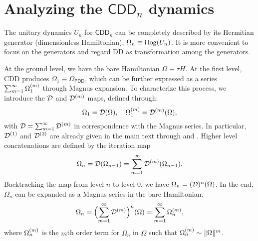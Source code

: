 \documentclass[pra,reprint,superscriptaddress]{revtex4-2}
\newcommand{\CDDn}{\mathsf{CDD}_n}
\begin{document}
\section{Analyzing the \texorpdfstring{$\CDDn$}{CDDn} dynamics}\label{app:CDD}

The unitary dynamics $U_n$ for $\CDDn$ can be completely described by its Hermitian generator (dimensionless Hamiltonian), $\Omega_n \equiv\mathrm{i}\log(U_n)$.
It is more convenient to focus on the generators and regard 
DD as transformation among the generators.

At the ground level, we have the bare Hamiltonian $\Omega\equiv\tau H$.
At the first level, CDD produces $\Omega_1\equiv \Omega_{\mathsf{PDD}}$, which can be further expressed as a series
 $\sum_{m=1}^\infty \Omega_1^{(m)}$ through Magnus expansion. 
 To characterize this process, we introduce the $\mathcal{D}$ and $\mathcal{D}^{(m)}$ 
 maps, defined through:
 \begin{equation}
  \Omega_1 = \mathcal{D}(\Omega), \quad \Omega_1^{(m)} = \mathcal{D}^{(m)}(\Omega),
 \end{equation}
with $\mathcal{D} = \sum_{m=1}^\infty \mathcal{D}^{(m)}$
in correspondence with the Magnus series. In particular, $\mathcal{D}^{(1)}$ and $\mathcal{D}^{(2)}$ are already given in the main text through  and . 
Higher level concatenations are defined by the iteration map 
\begin{equation}\label{eq:CDD-update}
    \Omega_n = \mathcal{D}(\Omega_{n-1}) = \sum_{m=1}^\infty \mathcal{D}^{(m)}(\Omega_{n-1}).
\end{equation}
Backtracking the map from level $n$ to level $0$, we have
$\Omega_{n} = (\mathcal{D})^{n}(\Omega)$. In the end, 
$\Omega_{n}$ can be expanded as a Magnus series in the bare Hamiltonian. 
\begin{equation}\label{eq:CDD-magnus}
\Omega_{n} =\Bigl(\sum_{m=1}^\infty \mathcal{D}^{(m)}\Bigr)^{n}(\Omega)=\sum_{m=1}^\infty \Omega_{n}^{(m)},
\end{equation}
where $\Omega_{n}^{(m)}$ is the $m$th order term for $\Omega_{n}$ in $\Omega$ such that $\Omega_{n}^{(m)}  \sim  \Vert {\Omega} \Vert^m$.
\end{document}
